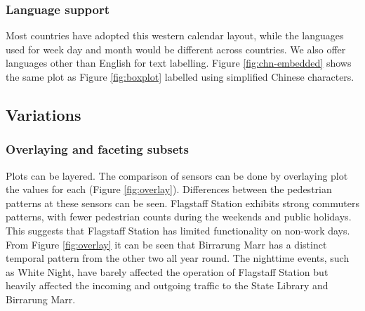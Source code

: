 \documentclass[12pt]{article}
\begin{document}
\hypertarget{language-support}{%
\subsubsection{Language support}\label{language-support}}

Most countries have adopted this western calendar layout, while the
languages used for week day and month would be different across
countries. We also offer languages other than English for text
labelling. Figure \ref{fig:chn-embedded} shows the same plot as Figure
\ref{fig:boxplot} labelled using simplified Chinese characters.

\hypertarget{variations}{%
\subsection{Variations}\label{variations}}

\label{sec:variations}

\hypertarget{overlaying-and-faceting-subsets}{%
\subsubsection{Overlaying and faceting
subsets}\label{overlaying-and-faceting-subsets}}

Plots can be layered. The comparison of sensors can be done by
overlaying plot the values for each (Figure \ref{fig:overlay}).
Differences between the pedestrian patterns at these sensors can be
seen. Flagstaff Station exhibits strong commuters patterns, with fewer
pedestrian counts during the weekends and public holidays. This suggests
that Flagstaff Station has limited functionality on non-work days. From
Figure \ref{fig:overlay} it can be seen that Birrarung Marr has a
distinct temporal pattern from the other two all year round. The
nighttime events, such as White Night, have barely affected the
operation of Flagstaff Station but heavily affected the incoming and
outgoing traffic to the State Library and Birrarung Marr.
\end{document}
